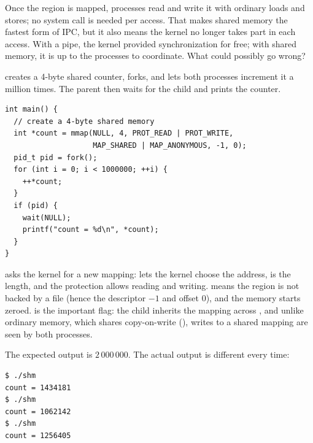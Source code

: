 Once the region is mapped, processes read and write it with ordinary loads and stores; no system call is needed per access. That makes shared memory the fastest form of IPC, but it also means the kernel no longer takes part in each access. With a pipe, the kernel provided synchronization for free; with shared memory, it is up to the processes to coordinate. What could possibly go wrong?

\begin{example}
  \label{ex:shm}
   creates a 4-byte shared counter, forks, and lets both processes increment it a million times. The parent then waits for the child and prints the counter.
\begin{lstlisting}
int main() {
  // create a 4-byte shared memory
  int *count = mmap(NULL, 4, PROT_READ | PROT_WRITE,
                    MAP_SHARED | MAP_ANONYMOUS, -1, 0);
  pid_t pid = fork();
  for (int i = 0; i < 1000000; ++i) {
    ++*count;
  }
  if (pid) {
    wait(NULL);
    printf("count = %d\n", *count);
  }
}
\end{lstlisting}
   asks the kernel for a new mapping:  lets the kernel choose the address,  is the length, and the protection allows reading and writing.  means the region is not backed by a file (hence the descriptor $-1$ and offset $0$), and the memory starts zeroed.  is the important flag: the child inherits the mapping across , and unlike ordinary memory, which  shares copy-on-write (), writes to a shared mapping are seen by both processes.

  The expected output is $2\,000\,000$. The actual output is different every time:
\begin{lstlisting}[style=sh]
$ ./shm
count = 1434181
$ ./shm
count = 1062142
$ ./shm
count = 1256405
\end{lstlisting}
\end{example}

